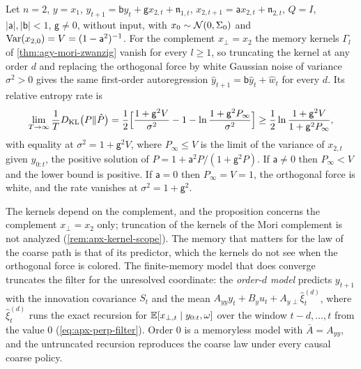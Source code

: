 \begin{proposition}\label{prop:apx-kernel-floor}
Let $n=2$, $y=x_1$, $y_{t+1}=\mathsf by_t+\mathsf gx_{2,t}+\mathfrak n_{1,t}$, $x_{2,t+1}=\mathsf ax_{2,t}+\mathfrak n_{2,t}$, $Q=I$, $\lvert\mathsf a\rvert,\lvert\mathsf b\rvert<1$, $\mathsf g\ne0$, without input, with $x_0\sim\mathcal{N}(0,\Sigma_0)$ and $\operatorname{Var}(x_{2,0})=V=(1-\mathsf a^2)^{-1}$. For the complement $x_\perp=x_2$ the memory kernels $\Gamma_l$ of \cref{thm:agy-mori-zwanzig} vanish for every $l\ge1$, so truncating the kernel at any order $d$ and replacing the orthogonal force by white Gaussian noise of variance $\sigma^2>0$ gives the same first-order autoregression $\hat y_{t+1}=\mathsf b\hat y_t+\hat w_t$ for every $d$. Its relative entropy rate is
\begin{equation}\label{eq:apx-kernel-floor}
\lim_{T\to\infty}\frac1TD_{\mathrm{KL}}\bigl(P\Vert\hat P\bigr)=\frac12\Bigl[\frac{1+\mathsf g^2V}{\sigma^2}-1-\ln\frac{1+\mathsf g^2P_\infty}{\sigma^2}\Bigr]\ge\frac12\ln\frac{1+\mathsf g^2V}{1+\mathsf g^2P_\infty},
\end{equation}
with equality at $\sigma^2=1+\mathsf g^2V$, where $P_\infty\le V$ is the limit of the variance of $x_{2,t}$ given $y_{0:t}$, the positive solution of $P=1+\mathsf a^2P/(1+\mathsf g^2P)$. If $\mathsf a\ne0$ then $P_\infty<V$ and the lower bound is positive. If $\mathsf a=0$ then $P_\infty=V=1$, the orthogonal force is white, and the rate vanishes at $\sigma^2=1+\mathsf g^2$.
\end{proposition}

The kernels depend on the complement, and the proposition concerns the complement $x_\perp=x_2$ only; truncation of the kernels of the Mori complement is not analyzed (\cref{rem:apx-kernel-scope}). The memory that matters for the law of the coarse path is that of its predictor, which the kernels do not see when the orthogonal force is colored. The finite-memory model that does converge truncates the filter for the unresolved coordinate: the \emph{order-$d$ model} predicts $y_{t+1}$ with the innovation covariance $S_t$ and the mean $A_{yy}y_t+B_yu_t+A_{y\perp}\hat\xi^{(d)}_t$, where $\hat\xi^{(d)}_t$ runs the exact recursion for $\mathbb{E}[x_{\perp,t}\mid y_{0:t},\omega]$ over the window $t-d,\dots,t$ from the value $0$ (\cref{eq:apx-perp-filter}). Order $0$ is a memoryless model with $\bar A=A_{yy}$, and the untruncated recursion reproduces the coarse law under every causal coarse policy.

